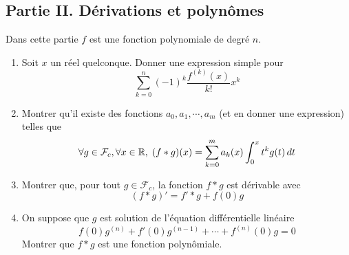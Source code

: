 \subsection*{Partie II. Dérivations et polynômes}
Dans cette partie $f$ est une fonction polynomiale de degré $n$.
\begin{enumerate}
 \item Soit $x$ un réel quelconque. Donner une expression simple pour
\begin{displaymath}
 \sum_{k=0}^n(-1)^k\frac{f^{(k)}(x)}{k!}x^k
\end{displaymath}
\item Montrer qu'il existe des fonctions $a_0,a_1,\cdots,a_m$ (et en donner une expression) telles que
\begin{displaymath}
 \forall g \in \mathcal F_c, \forall x \in \mathbb{R}, \;
(f*g)(x) = \sum_{k=0}^ma_k(x)\int_0^xt^kg(t)\,dt
\end{displaymath}
\item Montrer que, pour tout $g\in \mathcal F_c$, la fonction $f*g$ est dérivable avec
\begin{displaymath}
 (f*g)' = f'*g+f(0)g
\end{displaymath}
\item On suppose que $g$ est solution de l'équation différentielle linéaire
\begin{displaymath}
 f(0)g^{(n)} + f'(0)g^{(n-1)} + \cdots + f^{(n)}(0)g = 0  
\end{displaymath}
Montrer que $f*g$ est une fonction polynômiale.
\end{enumerate}
